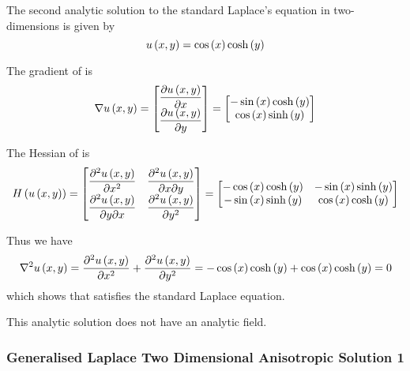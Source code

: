 The second analytic solution to the standard Laplace's equation in two-dimensions is given by
\begin{equation}
  \fnof{u}{x,y}=\cosine{x}\hypecosine{y}
  \label{eqn:StandardLaplaceTwoDAnalytic2}
\end{equation}

The gradient of  is
\begin{equation}
  \gradient{}{\fnof{u}{x,y}}=\begin{bmatrix}
  \delby{\fnof{u}{x,y}}{x} \\
  \delby{\fnof{u}{x,y}}{y}
  \end{bmatrix}=\begin{bmatrix}
  -\sine{x}\hypecosine{y} \\
  \cosine{x}\hypesine{y}
  \end{bmatrix}
  \label{eqn:StandardLaplaceTwoDAnalyticGradient2}
\end{equation}

The Hessian of  is
\begin{equation}
  \hessian{}{\fnof{u}{x,y}}=\begin{bmatrix}
  \deltwosqby{\fnof{u}{x,y}}{x} & \deltwoby{\fnof{u}{x,y}}{x}{y} \\
  \deltwoby{\fnof{u}{x,y}}{y}{x} & \deltwosqby{\fnof{u}{x,y}}{y}
  \end{bmatrix}=\begin{bmatrix}
  -\cosine{x}\hypecosine{y} & -\sine{x}\hypesine{y} \\
  -\sine{x}\hypesine{y} & \cosine{x}\hypecosine{y}
  \end{bmatrix}
  \label{eqn:StandardLaplaceTwoDAnalyticHessian2}
\end{equation}

Thus we have
\begin{equation}
  \laplacian{}{\fnof{u}{x,y}}=\deltwosqby{\fnof{u}{x,y}}{x}+\deltwosqby{\fnof{u}{x,y}}{y}=-\cosine{x}\hypecosine{y}+
  \cosine{x}\hypecosine{y}=0
\end{equation}
which shows that  satisfies the standard Laplace equation.

This analytic solution does not have an analytic field.

\subsubsection{Generalised Laplace Two Dimensional Anisotropic Solution 1}


